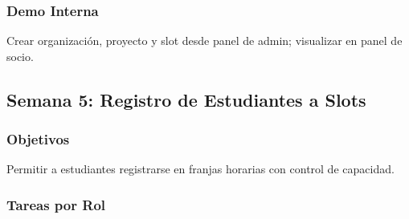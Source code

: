 \documentclass[12pt,a4paper]{article}
\begin{document}
\subsubsection{Demo Interna}
Crear organización, proyecto y slot desde panel de admin; visualizar en panel de socio.

\subsection{Semana 5: Registro de Estudiantes a Slots}

\subsubsection{Objetivos}
Permitir a estudiantes registrarse en franjas horarias con control de capacidad.

\subsubsection{Tareas por Rol}
\end{document}
